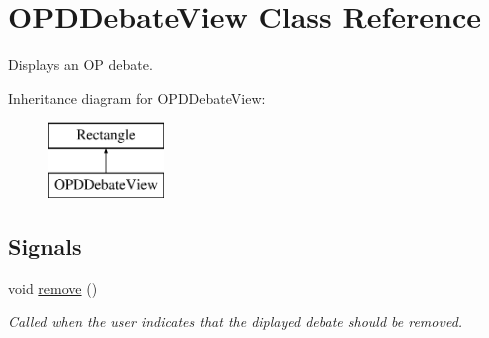 \hypertarget{classOPDDebateView}{\section{O\-P\-D\-Debate\-View Class Reference}
\label{classOPDDebateView}
}


Displays an O\-P debate.  


Inheritance diagram for O\-P\-D\-Debate\-View\-:\begin{figure}[H]
\begin{center}
\leavevmode
\includegraphics[height=2.000000cm]{classOPDDebateView}
\end{center}
\end{figure}
\subsection*{Signals}
\begin{DoxyCompactItemize}
\item 
\hypertarget{classOPDDebateView_a46391129857f2a878384174bbe30804d}{void \hyperlink{classOPDDebateView_a46391129857f2a878384174bbe30804d}{remove} ()}\label{classOPDDebateView_a46391129857f2a878384174bbe30804d}

\begin{DoxyCompactList}\small\item\em Called when the user indicates that the diplayed debate should be removed. \end{DoxyCompactList}\end{DoxyCompactItemize}
